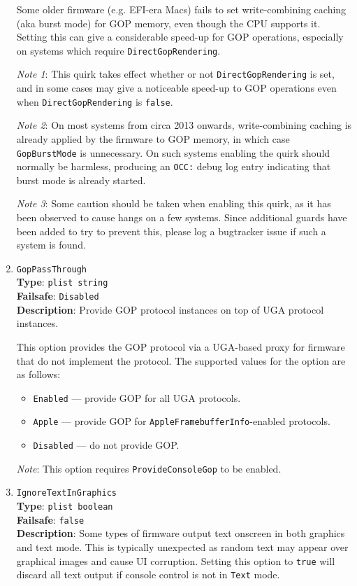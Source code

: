 \documentclass[]{article}
\providecommand{\tightlist}{%
  \setlength{\itemsep}{0pt}\setlength{\parskip}{0pt}}
\begin{document}
\begin{enumerate}
  Some older firmware (e.g. EFI-era Macs) fails to set write-combining caching (aka burst mode)
  for GOP memory, even though the CPU supports it. Setting this can give a considerable
  speed-up for GOP operations, especially on systems which require \texttt{DirectGopRendering}.

  \emph{Note 1}: This quirk takes effect whether or not \texttt{DirectGopRendering} is set, and
  in some cases may give a noticeable speed-up to GOP operations even when \texttt{DirectGopRendering}
  is \texttt{false}.

  \emph{Note 2}: On most systems from circa 2013 onwards, write-combining
  caching is already applied by the firmware to GOP memory, in which case \texttt{GopBurstMode}
  is unnecessary. On such systems enabling the quirk should normally be harmless, producing an
  \texttt{OCC:} debug log entry indicating that burst mode is already started.

  \emph{Note 3}: Some caution should be taken when enabling this quirk, as it has been observed
  to cause hangs on a few systems. Since additional guards have been added to try to prevent this,
  please log a bugtracker issue if such a system is found.

\item
  \texttt{GopPassThrough}\\
  \textbf{Type}: \texttt{plist\ string}\\
  \textbf{Failsafe}: \texttt{Disabled}\\
  \textbf{Description}: Provide GOP protocol instances on top of UGA protocol instances.

  This option provides the GOP protocol via a UGA-based proxy
  for firmware that do not implement the protocol. The supported values
  for the option are as follows:

  \begin{itemize}
    \tightlist
    \item \texttt{Enabled} --- provide GOP for all UGA protocols.
    \item \texttt{Apple} --- provide GOP for \texttt{AppleFramebufferInfo}-enabled protocols.
    \item \texttt{Disabled} --- do not provide GOP.
  \end{itemize}

  \emph{Note}: This option requires \texttt{ProvideConsoleGop} to be enabled.

\item
  \texttt{IgnoreTextInGraphics}\\
  \textbf{Type}: \texttt{plist\ boolean}\\
  \textbf{Failsafe}: \texttt{false}\\
  \textbf{Description}: Some types of firmware output text onscreen in both graphics and
  text mode. This is typically unexpected as random text may appear over
  graphical images and cause UI corruption. Setting this option to \texttt{true} will
  discard all text output if console control is not in \texttt{Text} mode.


\end{enumerate}
\end{document}
